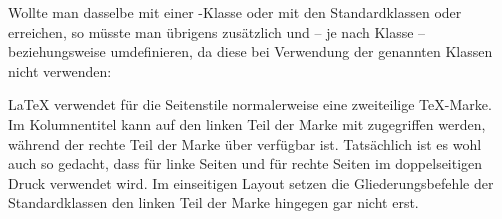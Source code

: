 \begin{Example}
      Wollte man dasselbe mit einer \KOMAScript-Klasse oder mit den
      Standardklassen  oder  erreichen, so müsste
      man übrigens zusätzlich
       und --
      je nach Klasse --
      beziehungsweise %
      umdefinieren, da diese bei Verwendung der genannten Klassen
       nicht verwenden:
    \end{Example}
  \fi%
  \EndIndexGroup


  \begin{Declaration}
  \end{Declaration}
  \LaTeX{} verwendet für die Seitenstile
  normalerweise eine zweiteilige \TeX-Marke. Im Kolumnentitel kann auf den
  linken Teil der Marke mit %
   zugegriffen
  werden, während der rechte Teil der Marke über
   verfügbar
  ist. Tatsächlich ist es wohl auch so gedacht, dass
   für linke Seiten und
   für rechte Seiten im doppelseitigen Druck
  verwendet wird. Im einseitigen Layout setzen die Gliederungsbefehle der
  Standardklassen den linken Teil der Marke hingegen gar nicht erst.

